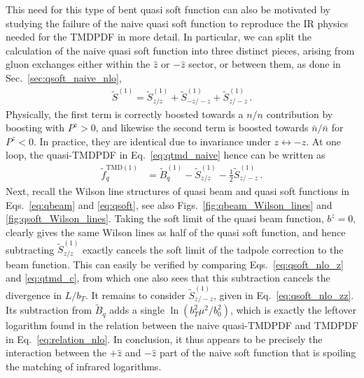 \documentclass[11pt,a4paper]{article}
\DeclareRobustCommand{\eq}[1]{Eq.~\eqref{eq:#1}}
\DeclareRobustCommand{\eqs}[2]{Eqs.~\eqref{eq:#1} and \eqref{eq:#2}}
\DeclareRobustCommand{\figs}[2]{Figs.~\ref{fig:#1} and \ref{fig:#2}}
\DeclareRobustCommand{\sec}[1]{Sec.~\ref{sec:#1}}
\newcommand{\bn}{{\bar{n}}}
\newcommand\TMD{\mathrm{TMD}}
\begin{document}
This need for this type of bent quasi soft function can also be motivated by 
studying the failure of the naive quasi soft function to reproduce the IR physics needed for the TMDPDF in more detail. In particular, we can split the calculation of the naive quasi soft function into three distinct pieces,
arising from gluon exchanges either within the $\hat z$ or $-\hat z$ sector,
or between them, as done in \sec{qsoft_naive_nlo},
\begin{align}
 \tilde S^{(1)} = \tilde S_{z/z}^{(1)} + \tilde S_{-z/-z}^{(1)} + \tilde S_{z/-z}^{(1)}
\,.\end{align}
Physically, the first term is correctly boosted towards a $n/n$ contribution
by boosting with $P^z > 0$, and likewise the second term is boosted towards $\bn/\bn$
for $P^z < 0$. In practice, they are identical due to invariance under $z \leftrightarrow -z$.
At one loop, the quasi-TMDPDF in \eq{qtmd_naive} hence can be written as
\begin{align}
 \tilde f_{q}^{\TMD (1)} &
 = \tilde B^{(1)}_{q} - \tilde S_{z/z}^{(1)} - \frac{1}{2} \tilde S_{z/-z}^{(1)}
\,.\end{align}
Next, recall the Wilson line structures of quasi beam and quasi soft functions in \eqs{qbeam}{qsoft}, see also \figs{qbeam_Wilson_lines}{qsoft_Wilson_lines}.
Taking the soft limit of the quasi beam function, $b^z = 0$,
clearly gives the same Wilson lines as half of the quasi soft function,
and hence subtracting $\tilde S_{z/z}^{(1)}$ exactly cancels the soft limit
of the tadpole correction to the beam function. This can easily be verified
by comparing \eqs{qsoft_nlo_z}{qtmd_c}, from which one also sees
that this subtraction cancels the divergence in $L/b_T$.
%
It remains to consider $\tilde S_{z/-z}^{(1)}$, given in \eq{qsoft_nlo_zz}.
Its subtraction from $\tilde B_{q}$ adds a single $\ln(b_T^2\mu^2/b_0^2)$, which is exactly the leftover logarithm found in the relation between the naive quasi-TMDPDF and TMDPDF in \eq{relation_nlo}.
In conclusion, it thus appears to be precisely the interaction between the $+\hat z$ and $-\hat z$
part of the naive soft function that is spoiling the matching of infrared logarithms. 
\end{document}
